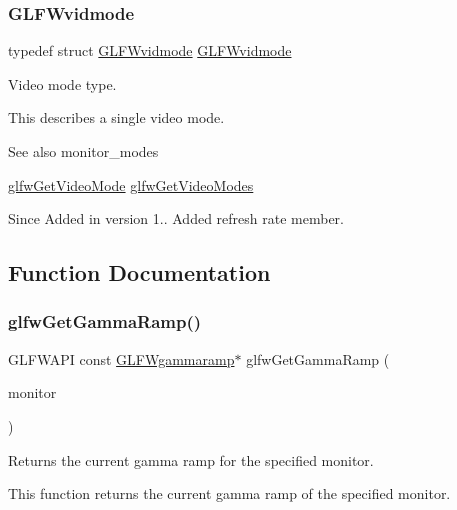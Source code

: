 \subsubsection{\texorpdfstring{G\+L\+F\+Wvidmode}{GLFWvidmode}}
{\footnotesize\ttfamily typedef struct \hyperlink{struct_g_l_f_wvidmode}{G\+L\+F\+Wvidmode}  \hyperlink{struct_g_l_f_wvidmode}{G\+L\+F\+Wvidmode}}



Video mode type. 

This describes a single video mode.

\begin{DoxySeeAlso}{See also}
monitor\+\_\+modes 

\hyperlink{group__monitor_gac234b63ec525c70d7e18ac84aca088c6}{glfw\+Get\+Video\+Mode} \hyperlink{group__monitor_ga811c28d61595e630774389985947c665}{glfw\+Get\+Video\+Modes}
\end{DoxySeeAlso}
\begin{DoxySince}{Since}
Added in version 1..  Added refresh rate member. 
\end{DoxySince}


\subsection{Function Documentation}
\mbox{\label{group__monitor_gaeeac9198f3c91b83440eed679441f76b}} 
\subsubsection{\texorpdfstring{glfw\+Get\+Gamma\+Ramp()}{glfwGetGammaRamp()}}
{\footnotesize\ttfamily G\+L\+F\+W\+A\+PI const \hyperlink{struct_g_l_f_wgammaramp}{G\+L\+F\+Wgammaramp}$\ast$ glfw\+Get\+Gamma\+Ramp (\begin{DoxyParamCaption}\item[{\hyperlink{group__monitor_ga8d9efd1cde9426692c73fe40437d0ae3}{G\+L\+F\+Wmonitor} $\ast$}]{monitor }\end{DoxyParamCaption})}



Returns the current gamma ramp for the specified monitor. 

This function returns the current gamma ramp of the specified monitor.


